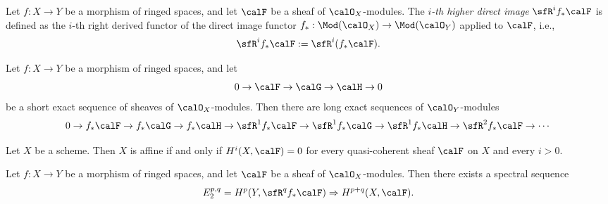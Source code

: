     \begin{definition}\label{def:higher_direct_image}
        Let \(f:X\to Y\) be a morphism of ringed spaces, and let \(\calF\) be a sheaf of \(\calO_X\)-modules.
        The \emph{\(i\)-th higher direct image} \(\sfR^i f_*\calF\) is defined as the \(i\)-th right derived functor of the direct image functor \(f_*:\Mod(\calO_X)\to \Mod(\calO_Y)\) applied to \(\calF\), i.e.,
        \[
            \sfR^i f_*\calF := \sfR^i (f_*\calF).
        \]
    \end{definition}

    \begin{proposition}\label{prop:long_exact_sequence_of_cohomology_and_direct_image_associated_to_short_exact_sequence_of_sheaves}
        Let \(f:X\to Y\) be a morphism of ringed spaces, and let
        \[
            0 \to \calF \to \calG \to \calH \to 0
        \]
        be a short exact sequence of sheaves of \(\calO_X\)-modules.
        Then there are long exact sequences of \(\calO_Y\)-modules
        \[
            0 \to f_*\calF \to f_*\calG \to f_*\calH \to \sfR^1 f_*\calF \to \sfR^1 f_*\calG \to \sfR^1 f_*\calH \to \sfR^2 f_*\calF \to \cdots
        \]
    \end{proposition}

    \begin{theorem}\label{thm:affine_criterion_by_Serre}
        Let \(X\) be a scheme.
        Then \(X\) is affine if and only if \(H^i(X,\calF) = 0\) for every quasi-coherent sheaf \(\calF\) on \(X\) and every \(i>0\).
    \end{theorem}
    
    \begin{theorem}\label{thm:Leray_spectral_sequence}
        Let \(f:X\to Y\) be a morphism of ringed spaces, and let \(\calF\) be a sheaf of \(\calO_X\)-modules.
        Then there exists a spectral sequence
        \[
            E_2^{p,q} = H^p(Y,\sfR^q f_*\calF) \Rightarrow H^{p+q}(X,\calF).
        \]
    \end{theorem}
    